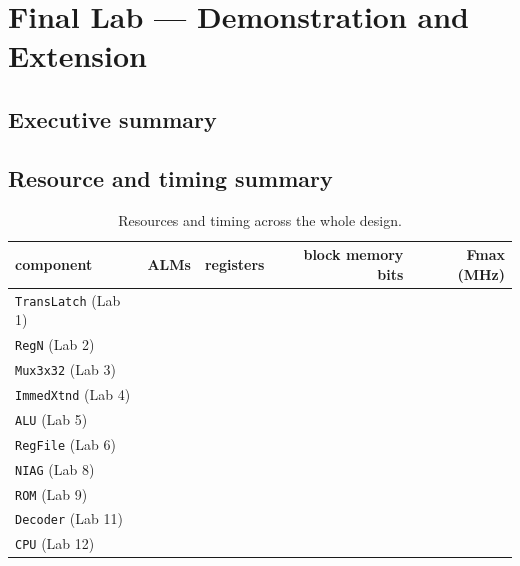 
\chapter{Final Lab --- Demonstration and Extension}

\section{Executive summary}
%
%

\section{Resource and timing summary}


\begin{table}[htbp]
\centering
\caption{Resources and timing across the whole design.}
\label{tab:final-resources}
\begin{tabular}{lrrrr}
\toprule
component & ALMs & registers & block memory bits & Fmax (MHz) \\
\midrule
\texttt{TransLatch} (Lab 1) & & & & \\
\texttt{RegN} (Lab 2) & & & & \\
\texttt{Mux3x32} (Lab 3) & & & & \\
\texttt{ImmedXtnd} (Lab 4) & & & & \\
\texttt{ALU} (Lab 5) & & & & \\
\texttt{RegFile} (Lab 6) & & & & \\
\texttt{NIAG} (Lab 8) & & & & \\
\texttt{ROM} (Lab 9) & & & & \\
\texttt{Decoder} (Lab 11) & & & & \\
\midrule
\texttt{CPU} (Lab 12) & & & & \\
\bottomrule
\end{tabular}
\end{table}

